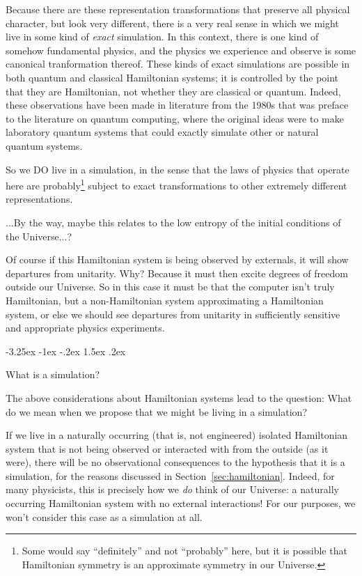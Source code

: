 \documentclass[letterpaper]{article}
\makeatletter
\renewcommand\section{\@startsection {section}{1}{\z@}%
  {-3.25ex \@plus -1ex \@minus -.2ex}%
  {1.5ex \@plus .2ex}%
  {\raggedright\normalfont\large\bfseries}}
\newcommand{\sectionname}{Section}
\newcommand{\secref}[1]{\sectionname~\ref{#1}}
\makeatother
\begin{document}
Because there are these representation transformations that preserve all physical character, but look very different, there is a very real sense in which we might live in some kind of \emph{exact} simulation.
In this context, there is one kind of somehow fundamental physics, and the physics we experience and observe is some canonical tranformation thereof.
These kinds of exact simulations are possible in both quantum and classical Hamiltonian systems; it is controlled by the point that they are Hamiltonian, not whether they are classical or quantum.
Indeed, these observations have been made in literature from the 1980s \cite{feynman, feynman2} that was preface to the literature on quantum computing, where the original ideas were to make laboratory quantum systems that could exactly simulate other or natural quantum systems.

So we DO live in a simulation, in the sense that the laws of physics that operate here are probably\footnote{Some would say ``definitely'' and not ``probably'' here, but it is possible that Hamiltonian symmetry is an approximate symmetry in our Universe.} subject to exact transformations to other extremely different representations.

...By the way, maybe this relates to the low entropy of the initial conditions of the Universe...?

Of course if this Hamiltonian system is being observed by externals, it will show departures from unitarity. Why? Because it must then excite degrees of freedom outside our Universe. So in this case it must be that the computer isn't truly Hamiltonian, but a non-Hamiltonian system approximating a Hamiltonian system, or else we should see departures from unitarity in sufficiently sensitive and appropriate physics experiments.

\section{What is a simulation?}\label{sec:classification}

The above considerations about Hamiltonian systems lead to the question: What do we mean when we propose that we might be living in a simulation?

If we live in a naturally occurring (that is, not engineered) isolated Hamiltonian system that is not being observed or interacted with from the outside (as it were), there will be no observational consequences to the hypothesis that it is a simulation, for the reasons discussed in \secref{sec:hamiltonian}.
Indeed, for many physicists, this is precisely how we \emph{do} think of our Universe:
a naturally occurring Hamiltonian system with no external interactions!
For our purposes, we won't consider this case as a simulation at all.
\end{document}
